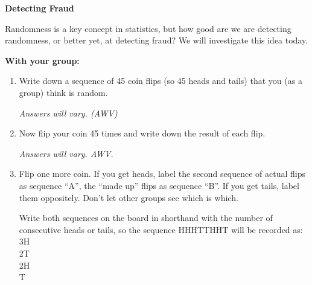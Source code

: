 

\newpage


\begin{center}
{\bf  Detecting Fraud }\\
\end{center}
\vspace{-.2in}

Randomness is a key concept in statistics, but how good are we are
detecting randomness, or better yet, at detecting fraud?  We will
investigate this idea today. 

\textbf{With your group:}
\begin{enumerate}
  \item Write down a sequence of 45 coin flips (so 45 heads and tails)
    that you (as a group) think is random. 
\begin{students}
  \vspace{1cm}
\end{students}    
\begin{key}
   {\it Answers will vary. (AWV)}
\end{key}

  \item Now flip your coin 45 times and write down the result of each
    flip. \vspace{.5in} 
\begin{students}
  \vspace{1cm}
\end{students}    
\begin{key}
   {\it Answers will vary. AWV.}
\end{key}

  \item Flip one more coin.  If you get heads, label the second
    sequence of actual flips as sequence ``A'', the ``made up'' flips
    as sequence ``B''.  If you get tails, label them oppositely.
    Don't let other groups see which is which.

    Write both sequences on the board in shorthand with the number
    of consecutive heads or tails, so the sequence {\sf HHHTTHHT} will
    be recorded as:\\
    {\sf 3H\\2T\\2H\\T}


\end{enumerate}
